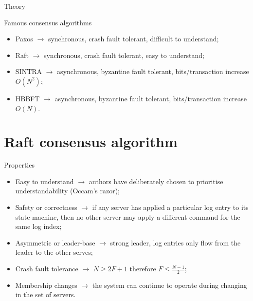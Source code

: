 \documentclass[presentation]{beamer}\mode<presentation>{\usetheme{AMSBolognaFC}}
\begin{document}
\begin{frame}[allowframebreaks]{Theory}
    \framebreak

    \begin{block}{Famous consensus algorithms}
        \begin{itemize}
            \item Paxos \cite{paxos} $\rightarrow$ synchronous, crash fault tolerant, difficult to understand;
            \item Raft \cite{raft} $\rightarrow$ synchronous, crash fault tolerant, easy to understand;
            \item SINTRA \cite{sintra} $\rightarrow$ asynchronous, byzantine fault tolerant, bits/transaction increase $O(N^2)$;
            \item HBBFT \cite{hbbft} $\rightarrow$  asynchronous, byzantine fault tolerant, bits/transaction increase $O(N)$.
        \end{itemize}
    \end{block}
\end{frame}

\section{Raft consensus algorithm}

\begin{frame}{Properties}
    \begin{itemize}
        \item Easy to understand $\rightarrow$ authors have deliberately chosen to prioritise understandability (Occam's razor);
        \item Safety or correctness $\rightarrow$ if any server has applied a particular log entry to its state machine, then no other server may apply a different command for the same log index;
        \item Asymmetric or leader-base $\rightarrow$ strong leader, log entries only flow from the leader to the other serves;
        \item Crash fault tolerance $\rightarrow$ $N \ge 2F + 1$ therefore $F \le \frac{N - 1}{2}$;
        \item Membership changes $\rightarrow$ the system can continue to operate during changing in the set of servers.
    \end{itemize}
\end{frame}
\end{document}
